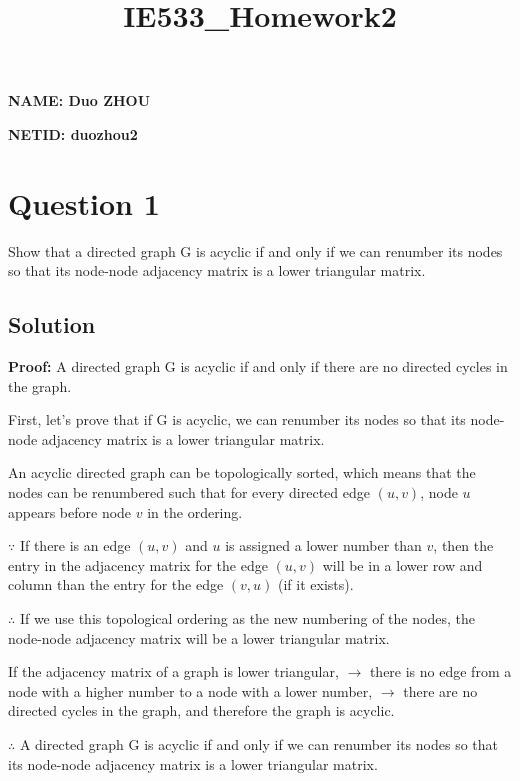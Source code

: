 \documentclass[11pt]{article}
\title{IE533\_Homework2}
\begin{document}
    
    \maketitle
    
    

    
    \textbf{NAME: Duo ZHOU}

\textbf{NETID: duozhou2}

    \hypertarget{question-1}{%
\section{Question 1}\label{question-1}}

Show that a directed graph G is acyclic if and only if we can renumber
its nodes so that its node-node adjacency matrix is a lower triangular
matrix.

    \hypertarget{solution}{%
\subsection{Solution}\label{solution}}

    \textbf{Proof:} A directed graph G is acyclic if and only if there are
no directed cycles in the graph.

First, let's prove that if G is acyclic, we can renumber its nodes so
that its node-node adjacency matrix is a lower triangular matrix.

An acyclic directed graph can be topologically sorted, which means that
the nodes can be renumbered such that for every directed edge
\((u, v)\), node \(u\) appears before node \(v\) in the ordering.

\(\because\) If there is an edge \((u, v)\) and \(u\) is assigned a
lower number than \(v\), then the entry in the adjacency matrix for the
edge \((u, v)\) will be in a lower row and column than the entry for the
edge \((v, u)\) (if it exists).

\(\therefore\) If we use this topological ordering as the new numbering
of the nodes, the node-node adjacency matrix will be a lower triangular
matrix.

If the adjacency matrix of a graph is lower triangular, \(\to\) there is
no edge from a node with a higher number to a node with a lower number,
\(\to\) there are no directed cycles in the graph, and therefore the
graph is acyclic.

\(\therefore\) A directed graph G is acyclic if and only if we can
renumber its nodes so that its node-node adjacency matrix is a lower
triangular matrix.
\end{document}
